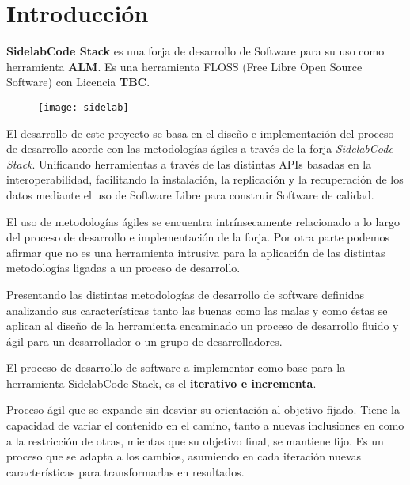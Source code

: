 \chapter{Introducci\'on}
\label{chap:introduccion}

\par \textbf{SidelabCode Stack} es una forja de desarrollo de Software para su uso como herramienta \textbf{ALM}. Es una herramienta FLOSS (Free Libre Open Source Software) con Licencia \textbf{TBC}.

\begin{figure}[h]
    \begin{center}	
        \texttt{[image: sidelab]}
        \label{fig:sidelab}
    \end{center}
\end{figure}

\par El desarrollo de este proyecto se basa en el dise\~no e implementaci\'on del proceso de desarrollo acorde con las metodolog\'ias \'agiles a trav\'es de la forja \emph{SidelabCode Stack}. Unificando herramientas a trav\'es de las distintas APIs basadas en la interoperabilidad, facilitando la instalaci\'on, la replicaci\'on y la recuperaci\'on de los datos mediante el uso de Software Libre para construir Software de calidad.

\par El uso de metodolog\'ias \'agiles se encuentra intr\'insecamente relacionado a lo largo del proceso de desarrollo e implementaci\'on de la forja. Por otra parte podemos afirmar que no es una herramienta intrusiva para la aplicaci\'on de las distintas metodolog\'ias ligadas a un proceso de desarrollo.

\par Presentando las distintas metodolog\'ias de desarrollo de software definidas analizando sus caracter\'isticas tanto las buenas como las malas y como \'estas se aplican al dise\~no de la herramienta encaminado un proceso de desarrollo fluido y \'agil para un desarrollador o un grupo de desarrolladores.

\par El proceso de desarrollo de software a implementar como base para la herramienta SidelabCode Stack, es el \textbf{iterativo e incrementa}.

\par Proceso ágil que se expande sin desviar su orientación al objetivo fijado. Tiene la capacidad de variar el contenido en el camino, tanto a nuevas inclusiones en como a la restricción de otras, mientas que su objetivo final, se mantiene fijo. Es un proceso que se adapta a los cambios, asumiendo en cada iteración nuevas características para transformarlas en resultados.

